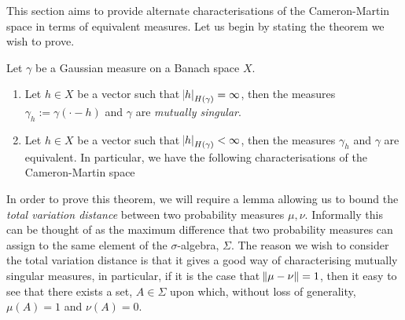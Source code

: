 \documentclass[../main.tex]{subfiles}
\begin{document}
This section aims to provide alternate characterisations of the Cameron-Martin space in terms of equivalent measures. Let us begin by stating the theorem we wish to prove.
\begin{theorem}
\label{the:CM}
Let $\gamma$ be a Gaussian measure on a Banach space $X$.
\begin{enumerate}
    \item Let $h\in X$ be a vector such that $\abs{h}_{H(\gamma)} = \infty$, then the measures $\gamma_h:=\gamma(\cdot-h)$ and $\gamma$ are \emph{mutually singular}.
    \item Let $h\in X$ be a vector such that $\abs{h}_{H(\gamma)}<\infty$, then the measures $\gamma_h$ and $\gamma$ are equivalent. In particular, we have the following characterisations of the Cameron-Martin space 
\end{enumerate}
\end{theorem}

In order to prove this theorem, we will require a lemma allowing us to bound the \emph{total variation distance}  between two probability measures $\mu,\nu$. Informally this can be thought of as the maximum difference that two probability measures can assign to the same element of the $\sigma$-algebra, $\Sigma$. The reason we wish to consider the total variation distance is that it gives a good way of characterising mutually singular measures, in particular, if it is the case that $\norm{\mu-\nu} = 1$, then it easy to see that there exists a set, $A\in\Sigma$ upon which, without loss of generality, $\mu(A) = 1$ and $\nu(A) = 0$.
\end{document}
